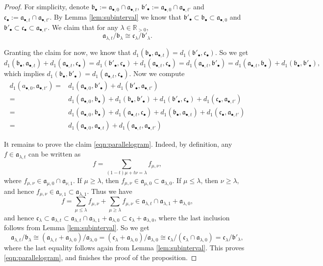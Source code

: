 \documentclass[11pt, leqno]{amsart}%
\theoremstyle{plain}
\theoremstyle{definition}
\theoremstyle{remark}
\newcommand{\bR}{\mathbb{R}}
\newcommand{\fa}{\mathfrak{a}}
\newcommand{\fb}{\mathfrak{b}}
\newcommand{\fc}{\mathfrak{c}}
\numberwithin{equation}{section}
\begin{document}
\begin{proof}
    For simplicity, denote $\fb_\bullet:=\fa_{\bullet,0}\cap\fa_{\bullet,t}$, $\fb'_\bullet:=\fa_{\bullet,0}\cap\fa_{\bullet,t'}$ and $\fc_\bullet:=\fa_{\bullet,t}\cap\fa_{\bullet,t'}$. By Lemma \ref{lem:subinterval} we know that $\fb'_\bullet\subset\fb_\bullet\subset\fa_{\bullet,0}$ and $\fb'_\bullet\subset\fc_\bullet\subset\fa_{\bullet,t'}$. We claim that for any $\lambda\in\bR_{>0}$, 
    \begin{equation}\label{eqn:parallelogram}
        \fa_{\lambda,t}/\fb_\lambda\cong \fc_\lambda/\fb'_\lambda.
    \end{equation}
	
    Granting the claim for now, we know that $d_1(\fb_\bullet,\fa_{\bullet,t})=d_1(\fb'_\bullet,\fc_\bullet)$. So we get
    \[
        d_1(\fb_\bullet,\fa_{\bullet,t})+
        d_1(\fa_{\bullet,t},\fc_\bullet)=
        d_1(\fb'_\bullet,\fc_\bullet)+
        d_1(\fa_{\bullet,t},\fc_\bullet)
        =d_1(\fa_{\bullet,t},\fb'_\bullet)
        =d_1(\fa_{\bullet,t},\fb_\bullet)+
        d_1(\fb_\bullet,\fb'_\bullet),
    \]
    which implies $d_1(\fb_\bullet,\fb'_\bullet)=d_1(\fa_{\bullet,t},\fc_\bullet)$. Now we compute
    \begin{align*}
        d_1(a_{\bullet,0},\fa_{\bullet,t'})=
        &d_1(\fa_{\bullet,0},\fb'_\bullet)+
        d_1(\fb'_\bullet,\fa_{\bullet,t'})\\
        =&d_1(\fa_{\bullet,0},\fb_\bullet)+d_1(\fb_\bullet,\fb'_\bullet)+d_1(\fb'_\bullet,\fc_\bullet)+d_1(\fc_\bullet,\fa_{\bullet,t'})\\
        =&d_1(\fa_{\bullet,0},\fb_\bullet)+d_1(\fa_{\bullet,t},\fc_\bullet)+d_1(\fb_\bullet,\fa_{\bullet,t})+d_1(\fc_\bullet,\fa_{\bullet,t'})\\
        =&d_1(\fa_{\bullet,0},\fa_{\bullet,t})+d_1(\fa_{\bullet,t},\fa_{\bullet,t'})
        \end{align*}
	
    It remains to prove the claim \eqref{eqn:parallelogram}. Indeed, by definition, any $f\in\fa_{\lambda,t}$ can be written as
    \[
        f=\sum_{(1-t)\mu+t\nu=\lambda}f_{\mu,\nu},
    \]
    where $f_{\mu,\nu}\in\fa_{\mu,0}\cap\fa_{\nu,1}$. If $\mu\ge \lambda$, then $f_{\mu,\nu}\in\fa_{\mu,0}\subset \fa_{\lambda,0}$. If $\mu\le\lambda$, then $\nu\ge \lambda$, and hence $f_{\mu,\nu}\in\fa_{\nu,1}\subset \fa_{\lambda,1}$. Thus we have 
    \[
        f=\sum_{\mu\le\lambda}f_{\mu,\nu}+
        \sum_{\mu\ge\lambda}f_{\mu,\nu}\in
        \fa_{\lambda,t}\cap\fa_{\lambda,1}+\fa_{\lambda,0},
    \]
    and hence $\fc_\lambda\subset\fa_{\lambda,t}\subset\fa_{\lambda,t}\cap\fa_{\lambda,1}+\fa_{\lambda,0}\subset\fc_\lambda+\fa_{\lambda,0}$, where the last inclusion follows from Lemma \ref{lem:subinterval}. So we get
    \[
        \fa_{\lambda,t}/\fb_\lambda\cong
        (\fa_{\lambda,t}+\fa_{\lambda,0})/\fa_{\lambda,0}=(\fc_\lambda+\fa_{\lambda,0})/\fa_{\lambda,0}\cong\fc_\lambda/(\fc_\lambda\cap\fa_{\lambda,0})=\fc_\lambda/\fb'_\lambda,
    \]
    where the last equality follows again from Lemma \ref{lem:subinterval}. This proves \eqref{eqn:parallelogram}, and finishes the proof of the proposition.
\end{proof}
\end{document}
